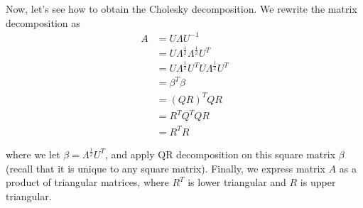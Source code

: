 Now, let's see how to obtain the Cholesky decomposition. We rewrite the matrix decomposition as
\begin{align*}
A &= U\Lambda U^{-1} \\
&=U\Lambda^{\frac{1}{2}}\Lambda^{\frac{1}{2}}U^{T}\\
&= U\Lambda^{\frac{1}{2}}U^TU\Lambda^{\frac{1}{2}}U^T\\
&=\beta^T\beta\\
&=(QR)^TQR\\
&=R^TQ^TQR\\
&=R^TR
\end{align*}

where we let $\beta=\Lambda^{\frac{1}{2}}U^T$, and apply QR decomposition on this square matrix $\beta$(recall that it is unique to any square matrix). Finally, we express matrix $A$ as a product of triangular matrices, where $R^T$ is lower triangular and $R$ is upper triangular.



